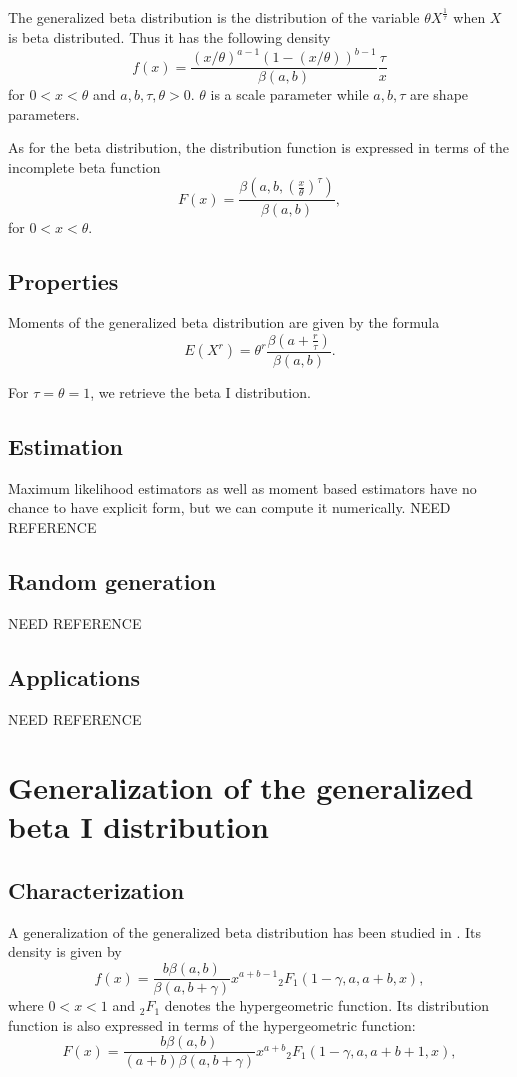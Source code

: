 The generalized beta distribution is the distribution of the variable $\theta X^{\frac{1}{\tau}}$ when $X$ is beta distributed. Thus it has the following density
$$
f(x) = \frac{(x/\theta)^{a-1} (1-(x/\theta))^{b-1}}{ \beta(a,b)}   \frac{\tau}{x}
$$
for $0<x<\theta$ and $a, b, \tau, \theta>0$. $\theta$ is a scale parameter while $a, b, \tau$ are shape parameters.

As for the beta distribution, the distribution function is expressed in terms of the incomplete beta function
$$
F(x) = \frac{\beta(a,b,(\frac{x}{\theta})^\tau)}{\beta(a,b)},
$$
for $0<x<\theta$.

\subsection{Properties}
Moments of the generalized beta distribution are given by the formula
$$
E(X^r) = \theta^r \frac{\beta(a+\frac{r}{\tau})}{\beta(a,b)}.
$$

For $\tau=\theta=1$, we retrieve the beta I distribution.

\subsection{Estimation}
Maximum likelihood estimators as well as moment based estimators have no chance to have explicit form, but we can compute it numerically.
NEED REFERENCE

\subsection{Random generation}
NEED REFERENCE
\subsection{Applications}
NEED REFERENCE

\section{Generalization of the generalized beta I distribution}
\subsection{Characterization}
A generalization of the generalized beta distribution has been studied in \cite{kotznadara}.
Its density is given by
$$
f(x) = \frac{b\beta(a,b)}{\beta(a,b+\gamma)} x^{a+b-1} {}_2F_1(1-\gamma, a, a+b,x),
$$
where $0<x<1$ and ${}_2F_1$ denotes the hypergeometric function.
Its distribution function is also expressed in terms of the hypergeometric function:
$$
F(x) = \frac{b\beta(a,b)}{(a+b)\beta(a,b+\gamma)} x^{a+b} {}_2F_1(1-\gamma, a, a+b+1,x),
$$

